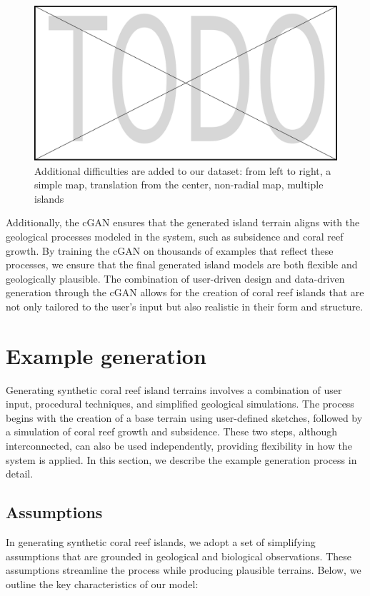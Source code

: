 \begin{figure}
    \includegraphics[width=0.9 \linewidth]{placeholder.pdf}
    \caption{Additional difficulties are added to our dataset: from left to right, a simple map, translation from the center, non-radial map, multiple islands}
    \label{fig:coral-island-difficulties-dataset}
\end{figure}

Additionally, the cGAN ensures that the generated island terrain aligns with the geological processes modeled in the system, such as subsidence and coral reef growth. By training the cGAN on thousands of examples that reflect these processes, we ensure that the final generated island models are both flexible and geologically plausible. The combination of user-driven design and data-driven generation through the cGAN allows for the creation of coral reef islands that are not only tailored to the user's input but also realistic in their form and structure.


\section{Example generation}
\label{sec:coral-island-example-generation}

Generating synthetic coral reef island terrains involves a combination of user input, procedural techniques, and simplified geological simulations. The process begins with the creation of a base terrain using user-defined sketches, followed by a simulation of coral reef growth and subsidence. These two steps, although interconnected, can also be used independently, providing flexibility in how the system is applied. In this section, we describe the example generation process in detail.


\subsection{Assumptions}
In generating synthetic coral reef islands, we adopt a set of simplifying assumptions that are grounded in geological and biological observations. These assumptions streamline the process while producing plausible terrains. Below, we outline the key characteristics of our model:


